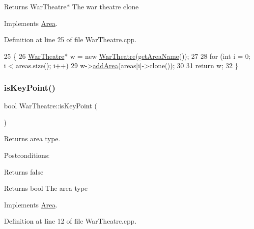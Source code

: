 \begin{DoxyReturn}{Returns}
War\+Theatre$\ast$ The war theatre clone 
\end{DoxyReturn}


Implements \hyperlink{classArea_a383d61c76b8fac66ef903036d776a3a4}{Area}.



Definition at line 25 of file War\+Theatre.\+cpp.


\begin{DoxyCode}
25                               \{
26     \hyperlink{classWarTheatre}{WarTheatre}* w = \textcolor{keyword}{new} \hyperlink{classWarTheatre_aa8bbedabf7a39a448d89cac0745ec0be}{WarTheatre}(\hyperlink{classArea_ad67916df281b6b172c4423627b65062a}{getAreaName}());
27 
28     \textcolor{keywordflow}{for} (\textcolor{keywordtype}{int} i = 0; i < areas.size(); i++)
29         w->\hyperlink{classWarTheatre_adc871336a6bf1263216b0f87da04cc57}{addArea}(areas[i]->clone());
30 
31     \textcolor{keywordflow}{return} w;
32 \}
\end{DoxyCode}
\mbox{\label{classWarTheatre_a01845ca2cc01367101b2884f2902bf88}} 
\subsubsection{\texorpdfstring{is\+Key\+Point()}{isKeyPoint()}}
{\footnotesize\ttfamily bool War\+Theatre\+::is\+Key\+Point (\begin{DoxyParamCaption}{ }\end{DoxyParamCaption})\hspace{0.3cm}{\ttfamily [virtual]}}



Returns area type. 

Postconditions\+:
\begin{DoxyItemize}
\item Returns false
\end{DoxyItemize}

\begin{DoxyReturn}{Returns}
bool The area type 
\end{DoxyReturn}


Implements \hyperlink{classArea}{Area}.



Definition at line 12 of file War\+Theatre.\+cpp.



